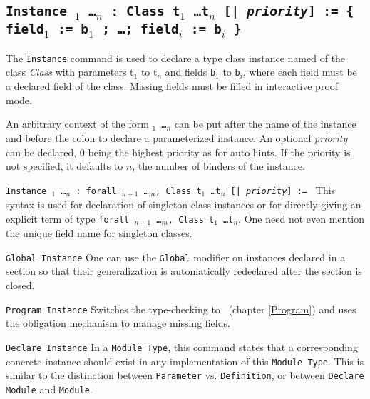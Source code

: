 \subsection{\tt Instance {\ident} {\binder$_1$ \ldots \binder$_n$} :
  {Class} {t$_1$ \ldots t$_n$} [| \textit{priority}]
  := \{ field$_1$ := b$_1$ ; \ldots ; field$_i$ := b$_i$ \}}
\label{Instance}

The \texttt{Instance} command is used to declare a type class instance
named {\ident} of the class \emph{Class} with parameters {t$_1$} to {t$_n$} and
fields {\tt b$_1$} to {\tt b$_i$}, where each field must be a declared
field of the class. Missing fields must be filled in interactive proof mode.

An arbitrary context of the form {\tt \binder$_1$ \ldots \binder$_n$}
can be put after the name of the instance and before the colon to
declare a parameterized instance.
An optional \textit{priority} can be declared, 0 being the highest
priority as for auto hints. If the priority is not specified, it defaults to
$n$, the number of binders of the instance.

\begin{Variants}
\item {\tt Instance {\ident} {\binder$_1$ \ldots \binder$_n$} :
    forall {\binder$_{n+1}$ \ldots \binder$_m$},
    {Class} {t$_1$ \ldots t$_n$} [| \textit{priority}] := \term} 
  This syntax is used for declaration of singleton class instances or
  for directly giving an explicit term of type
  {\tt forall {\binder$_{n+1}$ \ldots \binder$_m$}, {Class} {t$_1$ \ldots t$_n$}}.
  One need not even mention the unique field name for singleton classes.

\item {\tt Global Instance} One can use the \texttt{Global} modifier on
  instances declared in a section so that their generalization is automatically
  redeclared after the section is closed.

\item {\tt Program Instance} 
  Switches the type-checking to \Program~(chapter \ref{Program})
  and uses the obligation mechanism to manage missing fields.

\item {\tt Declare Instance} 
  In a {\tt Module Type}, this command states that a corresponding
  concrete instance should exist in any implementation of this
  {\tt Module Type}. This is similar to the distinction between
  {\tt Parameter} vs. {\tt Definition}, or between {\tt Declare Module}
  and {\tt Module}.

\end{Variants}

